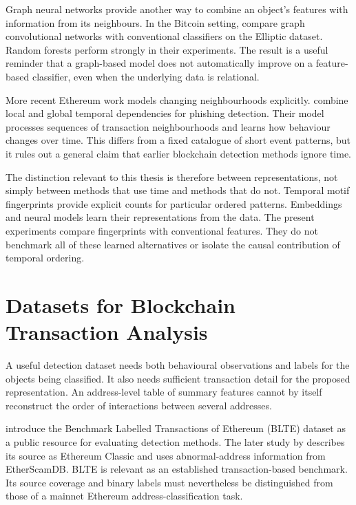 \documentclass{thesisclass}
\begin{document}
Graph neural networks provide another way to combine an object's features with
information from its neighbours. In the Bitcoin setting,
\citet{weber2019bitcoin} compare graph convolutional networks with conventional
classifiers on the Elliptic dataset. Random forests perform strongly in their
experiments. The result is a useful reminder that a graph-based model does not
automatically improve on a feature-based classifier, even when the underlying
data is relational.

More recent Ethereum work models changing neighbourhoods explicitly.
\citet{ghoshcatalog2025} combine local and global temporal dependencies for
phishing detection. Their model processes sequences of transaction
neighbourhoods and learns how behaviour changes over time. This differs from a
fixed catalogue of short event patterns, but it rules out a general claim that
earlier blockchain detection methods ignore time.

The distinction relevant to this thesis is therefore between representations,
not simply between methods that use time and methods that do not. Temporal
motif fingerprints provide explicit counts for particular ordered patterns.
Embeddings and neural models learn their representations from the data. The
present experiments compare fingerprints with conventional features. They do
not benchmark all of these learned alternatives or isolate the causal
contribution of temporal ordering.

\section{Datasets for Blockchain Transaction Analysis}
\label{sec:relwork_datasets}

A useful detection dataset needs both behavioural observations and labels for
the objects being classified. It also needs sufficient transaction detail for
the proposed representation. An address-level table of summary features cannot
by itself reconstruct the order of interactions between several addresses.

\citet{alemari2021labeled} introduce the Benchmark Labelled Transactions of
Ethereum (BLTE) dataset as a public resource for evaluating detection methods.
The later study by \citet{sanjalawe2023atd} describes its source as Ethereum
Classic and uses abnormal-address information from EtherScamDB. BLTE is relevant
as an established transaction-based benchmark. Its source coverage and binary
labels must nevertheless be distinguished from those of a mainnet Ethereum
address-classification task.
\end{document}
